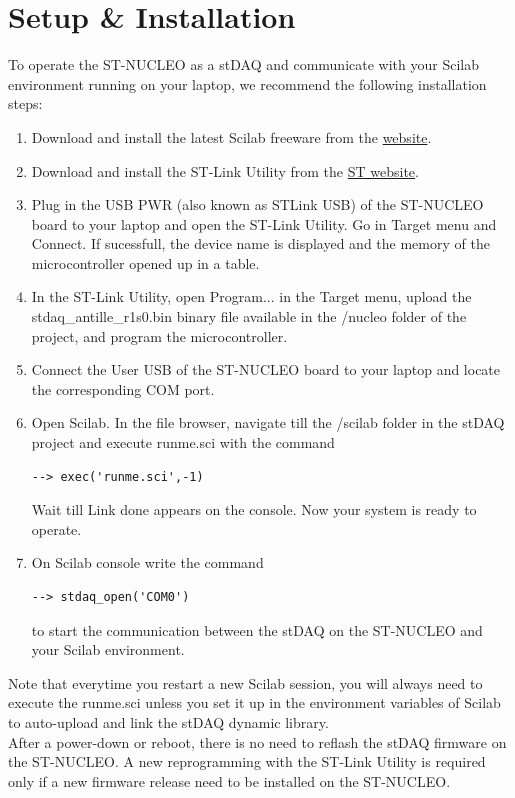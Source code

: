 \documentclass[letterpaper,10pt,english]{hitec}
\begin{document}
\newpage

\section{Setup \& Installation}

To operate the ST-NUCLEO as a stDAQ and communicate with your Scilab environment running on your laptop, we recommend the following installation steps:
\begin{enumerate}
\item Download and install the latest Scilab freeware from the \href{https://www.scilab.org/}{website}.
\item Download and install the ST-Link Utility from the \href{https://www.st.com/en/development-tools/stsw-link004.html}{ST website}.
\item Plug in the USB PWR (also known as STLink USB) of the ST-NUCLEO board to your laptop and open the ST-Link Utility. Go in Target menu and Connect. If sucessfull, the device name is displayed and the memory of the microcontroller opened up in a table. 
\item In the ST-Link Utility, open Program... in the Target menu, upload the stdaq\_antille\_r1s0.bin binary file available in the /nucleo folder of the project, and program the microcontroller. 
\item Connect the User USB of the ST-NUCLEO board to your laptop and locate the corresponding COM port.
\item Open Scilab. In the file browser, navigate till the /scilab folder in the stDAQ project and execute runme.sci with the command
\begin{verbatim}
--> exec('runme.sci',-1)
\end{verbatim}
Wait till Link done appears on the console. Now your system is ready to operate.
\item On Scilab console write the command 
\begin{verbatim}
--> stdaq_open('COM0')
\end{verbatim}
to start the communication between the stDAQ on the ST-NUCLEO and your Scilab environment.
\end{enumerate}

Note that everytime you restart a new Scilab session, you will always need to execute the runme.sci unless you set it up in the environment variables of Scilab to auto-upload and link the stDAQ dynamic library. \\
After a power-down or reboot, there is no need to reflash the stDAQ firmware on the ST-NUCLEO. 
A new reprogramming with the ST-Link Utility is required only if a new firmware release need to be installed on the ST-NUCLEO.
\end{document}
